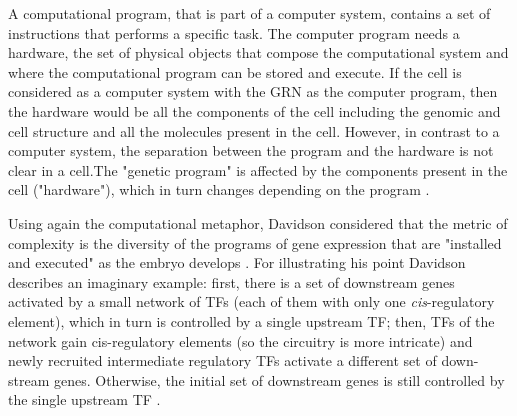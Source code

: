 A computational program, that is part of a computer system, contains a set of instructions that performs a specific task. The computer program needs a hardware, the set of physical objects that compose the computational system and where the computational program can be stored and execute.
If the cell is considered as a computer system with the GRN as the computer program, then the hardware would be all the components of the cell including the genomic and cell structure and all the molecules present in the cell.
However, in contrast to a computer system, the separation between the program and the hardware is not clear in a cell.The "genetic program" is affected by the components present in the cell ("hardware"), which in turn changes depending on the program \citep{susan2000ontogeny,Jaeger2014devmech}.
%

Using again the computational metaphor, Davidson considered that the metric of complexity is the diversity of the programs of gene expression that are "installed and executed" as the embryo develops \citep{Davidson2001}. For illustrating his point Davidson describes an imaginary example: first, there is a set of downstream genes activated by a small network of TFs (each of them with only one \textit{cis}-regulatory element), which in turn is controlled by a single upstream TF; then, TFs of the network gain cis-regulatory elements (so the circuitry is more intricate) and newly recruited intermediate regulatory TFs activate a different set of down-stream genes. Otherwise, the initial set of downstream genes is still controlled by the single upstream TF \citep{Davidson2001}.
   
